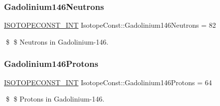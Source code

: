 \subsubsection{\texorpdfstring{Gadolinium146\+Neutrons}{Gadolinium146Neutrons}}
{\footnotesize\ttfamily \mbox{\hyperlink{group___isotope_const-_macros_ga5f18360b3e99483a35c32d789e62621c}{I\+S\+O\+T\+O\+P\+E\+C\+O\+N\+S\+T\+\_\+\+I\+NT}} Isotope\+Const\+::\+Gadolinium146\+Neutrons = 82}

\$ \$ Neutrons in Gadolinium-\/146. \mbox{\label{group___isotope_const-_gadolinium-_gd146_ga4dfdcd649695326f137e901ea112661c}} 
\subsubsection{\texorpdfstring{Gadolinium146\+Protons}{Gadolinium146Protons}}
{\footnotesize\ttfamily \mbox{\hyperlink{group___isotope_const-_macros_ga5f18360b3e99483a35c32d789e62621c}{I\+S\+O\+T\+O\+P\+E\+C\+O\+N\+S\+T\+\_\+\+I\+NT}} Isotope\+Const\+::\+Gadolinium146\+Protons = 64}

\$ \$ Protons in Gadolinium-\/146. 